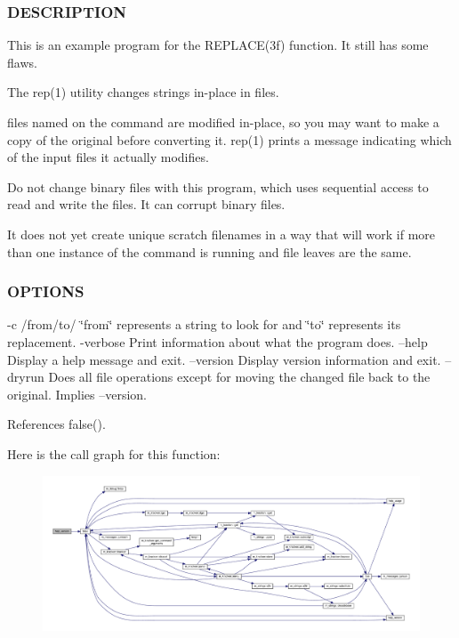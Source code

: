 \subsubsection*{D\+E\+S\+C\+R\+I\+P\+T\+I\+ON}

This is an example program for the R\+E\+P\+L\+A\+C\+E(3f) function. It still has some flaws.

The rep(1) utility changes strings in-\/place in files.

files named on the command are modified in-\/place, so you may want to make a copy of the original before converting it. rep(1) prints a message indicating which of the input files it actually modifies.

Do not change binary files with this program, which uses sequential access to read and write the files. It can corrupt binary files.

It does not yet create unique scratch filenames in a way that will work if more than one instance of the command is running and file leaves are the same. \subsubsection*{O\+P\+T\+I\+O\+NS}

-\/c /from/to/ \char`\"{}from\char`\"{} represents a string to look for and \char`\"{}to\char`\"{} represents its replacement. -\/verbose Print information about what the program does. --help Display a help message and exit. --version Display version information and exit. --dryrun Does all file operations except for moving the changed file back to the original. Implies --version. 

References false().

Here is the call graph for this function\+:
\nopagebreak
\begin{figure}[H]
\begin{center}
\leavevmode
\includegraphics[width=350pt]{rep_8f90_a39c21619b08a3c22f19e2306efd7f766_cgraph}
\end{center}
\end{figure}
\mbox{\label{rep_8f90_a6e3f64c6bb01cd2bdc33472e0505a863}} 
